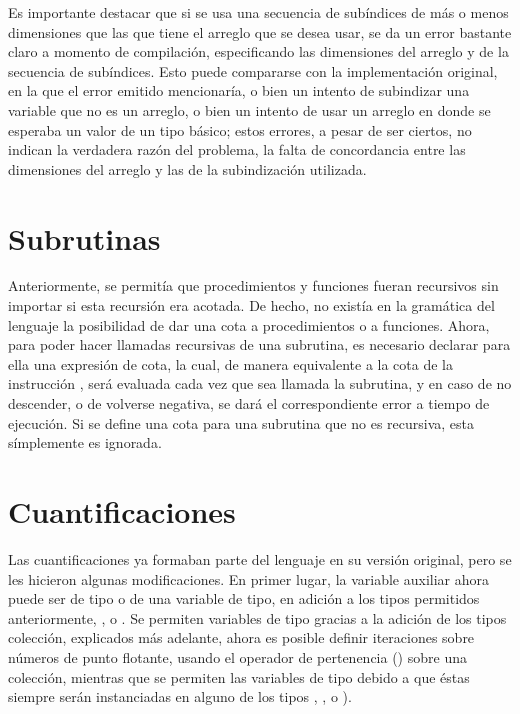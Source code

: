 Es importante destacar que si se usa una secuencia de subíndices de más o menos
dimensiones que las que tiene el arreglo que se desea usar, se da un error
bastante claro a momento de compilación, especificando las dimensiones del
arreglo y de la secuencia de subíndices. Esto puede compararse con la
implementación original, en la que el error emitido mencionaría, o bien un
intento de subindizar una variable que no es un arreglo, o bien un intento de
usar un arreglo en donde se esperaba un valor de un tipo básico; estos errores,
a pesar de ser ciertos, no indican la verdadera razón del problema, la falta de
concordancia entre las dimensiones del arreglo y las de la subindización
utilizada.

\section{Subrutinas}

Anteriormente, se permitía que procedimientos y funciones fueran recursivos sin
importar si esta recursión era acotada. De hecho, no existía en la gramática del
lenguaje la posibilidad de dar una cota a procedimientos o a funciones. Ahora,
para poder hacer llamadas recursivas de una subrutina, es necesario declarar
para ella una expresión de cota, la cual, de manera equivalente a la cota de la
instrucción , será evaluada cada vez que sea llamada la subrutina, y
en caso de no descender, o de volverse negativa, se dará el correspondiente
error a tiempo de ejecución. Si se define una cota para una subrutina que no es
recursiva, esta símplemente es ignorada.

\section{Cuantificaciones}

Las cuantificaciones ya formaban parte del lenguaje en su versión original, pero
se les hicieron algunas modificaciones. En primer lugar, la variable auxiliar
ahora puede ser de tipo  o de una variable de tipo, en adición a
los tipos permitidos anteriormente,  ,  o
. Se permiten variables de tipo  gracias a la
adición de los tipos colección, explicados más adelante, ahora es posible
definir iteraciones sobre números de punto flotante, usando el operador de
pertenencia (\Elem) sobre una colección, mientras que se permiten las variables
de tipo debido a que éstas siempre serán instanciadas en alguno de los
tipos , ,  o ).


